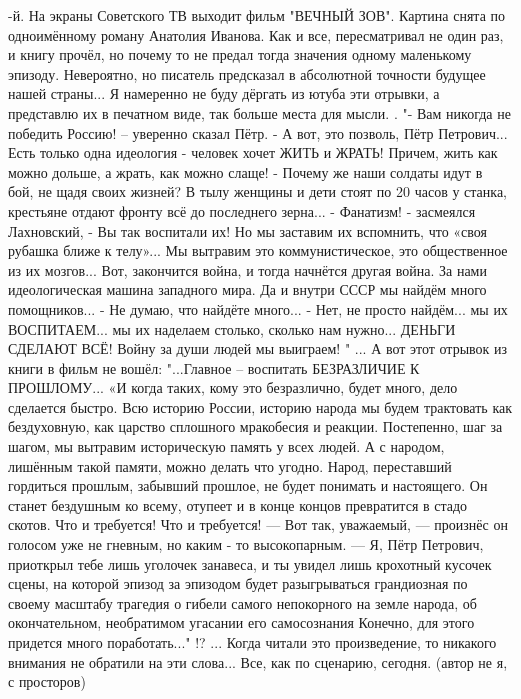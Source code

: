 \begin{itemize}

-й.
На экраны Советского ТВ выходит фильм "ВЕЧНЫЙ ЗОВ".
Картина снята по одноимённому роману Анатолия Иванова.
Как и все, пересматривал не один раз, и книгу прочёл, но почему то не предал тогда значения одному маленькому эпизоду.
Невероятно, но писатель предсказал в абсолютной точности будущее нашей страны...
Я намеренно не буду дёргать из ютуба эти отрывки, а представлю их в печатном виде, так больше места для мысли.
.
"- Вам никогда не победить Россию! – уверенно сказал Пётр.
- А вот, это позволь, Пётр Петрович... Есть только одна идеология - человек хочет ЖИТЬ и ЖРАТЬ! Причем, жить как можно дольше, а жрать, как можно слаще!
- Почему же наши солдаты идут в бой, не щадя своих жизней? В тылу женщины и дети стоят по 20 часов у станка, крестьяне отдают фронту всё до последнего зерна...
- Фанатизм! - засмеялся Лахновский, - Вы так воспитали их! Но мы заставим их вспомнить, что «своя рубашка ближе к телу»... Мы вытравим это коммунистическое, это общественное из их мозгов... Вот, закончится война, и тогда начнётся другая война. За нами идеологическая машина западного мира. Да и внутри СССР мы найдём много помощников...
- Не думаю, что найдёте много...
- Нет, не просто найдём... мы их ВОСПИТАЕМ... мы их наделаем столько, сколько нам нужно... ДЕНЬГИ СДЕЛАЮТ ВСЁ! Войну за души людей мы выиграем! "
...
А вот этот отрывок из книги в фильм не вошёл:
"...Главное – воспитать БЕЗРАЗЛИЧИЕ К ПРОШЛОМУ... «И когда таких, кому это безразлично, будет много, дело сделается быстро. Всю историю России, историю народа мы будем трактовать как бездуховную, как царство сплошного мракобесия и реакции. Постепенно, шаг за шагом, мы вытравим историческую память у всех людей. А с народом, лишённым такой памяти, можно делать что угодно. Народ, переставший гордиться прошлым, забывший прошлое, не будет понимать и настоящего. Он станет бездушным ко всему, отупеет и в конце концов превратится в стадо скотов. Что и требуется! Что и требуется! — Вот так, уважаемый, — произнёс он голосом уже не гневным, но каким - то высокопарным. — Я, Пётр Петрович, приоткрыл тебе лишь уголочек занавеса, и ты увидел лишь крохотный кусочек сцены, на которой эпизод за эпизодом будет разыгрываться грандиозная по своему масштабу трагедия о гибели самого непокорного на земле народа, об окончательном, необратимом угасании его самосознания Конечно, для этого придется много поработать..." !?
...
Когда читали это произведение, то никакого внимания не обратили на эти слова... Все, как по сценарию, сегодня.
(автор не я, с просторов)
\restorecr


\end{itemize}
